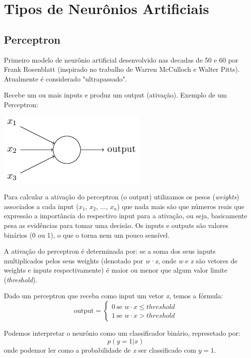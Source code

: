 \documentclass[11pt,a4paper,leqno]{article}
\begin{document}
\section{Tipos de Neurônios Artificiais}


\subsection{Perceptron}

Primeiro modelo de neurônio artificial desenvolvido nas decadas de 50 e 60 por Frank Rosenblatt (inspirado no trabalho de Warren McCulloch e Walter Pitts). Atualmente é considerado "ultrapassado".

Recebe um ou mais inputs e produz um output (ativação).
\linebreak
Exemplo de um Perceptron:

\includegraphics[scale=0.5]{Images/perceptron_model.png} 

Para calcular a ativação do perceptron (o output) utilizamos os pesos (\emph{weights}) associados a cada input ($x_1$, $x_2$, ..., $x_n$) que nada mais são que números reais que expressão a importância do respectivo input para a ativação, ou seja, basicamente pesa as evidências para tomar uma decisão.
Os inputs e outputs são valores binários (0 ou 1), o que o torna nem um pouco sensível.

A ativação do perceptron é determinada por: se a soma dos seus inputs multiplicados pelos seus weights (denotado por \emph{w·x}, onde \emph{w} e \emph{x} são vetores de weights e inputs respectivamente) é maior ou menor que algum valor limite (\emph{threshold}).

Dado um perceptron que receba como input um vetor \emph{x}, temos a fórmula:
\[
  \mbox{output} = \left\{ 
    \begin{array}{ll} 
      0 \ \mbox{se } w\cdot x \leq threshold \\
      1 \ \mbox{se } w\cdot x > threshold
    \end{array}
  \right.
\]

Podemos interpretar o neurônio como um classificador binário, represetado por:
\[ p(y = 1 | x) \]
onde podemor ler como a probabilidade de \emph{x} ser classificado com $y = 1$.
\end{document}
